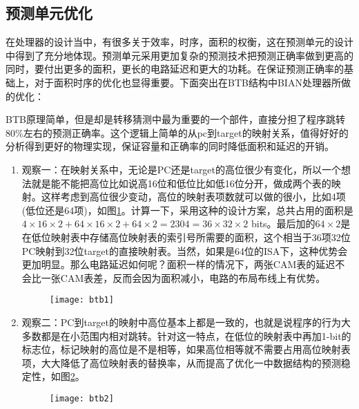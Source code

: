 \subsection{预测单元优化}
在处理器的设计当中，有很多关于效率，时序，面积的权衡，这在预测单元的设计中得到了充分地体现。预测单元采用更加复杂的预测技术把预测正确率做到更高的同时，要付出更多的面积，更长的电路延迟和更大的功耗。在保证预测正确率的基础上，对于面积时序的优化也显得重要。下面突出在BTB结构中BIAN处理器所做的优化：

BTB原理简单，但是却是转移猜测中最为重要的一个部件，直接分担了程序跳转80\%左右的预测正确率。这个逻辑上简单的从pc到target的映射关系，值得好好的分析得到更好的物理实现，保证容量和正确率的同时降低面积和延迟的开销。
\begin{enumerate}[label=(\arabic*)]
	\item 观察一：在映射关系中，无论是PC还是target的高位很少有变化，所以一个想法就是能不能把高位比如说高16位和低位比如低16位分开，做成两个表的映射。这样考虑到高位很少变动，高位的映射表项数就可以做的很小，比如4项(低位还是64项)，如图\ref{fig:btb_opt1}。计算一下，采用这种的设计方案，总共占用的面积是$ 4\times16\times2 + 64\times16\times2 + 64\times2 = 2304 = 36\times 32\times 2 $ bits。最后加的$ 64\times2 $是在低位映射表中存储高位映射表的索引号所需要的面积，这个相当于36项32位PC映射到32位target的直接映射表。当然，如果是64位的ISA下，这种优势会更加明显。那么电路延迟如何呢？面积一样的情况下，两张CAM表的延迟不会比一张CAM表差，反而会因为面积减小，电路的布局布线上有优势。
	\begin{figure}[!htbp]
		\centering
		\texttt{[image: btb1]}
		\label{fig:btb_opt1}
	\end{figure}	
	\item 观察二：PC到target的映射中高位基本上都是一致的，也就是说程序的行为大多数都是在小范围内相对跳转。针对这一特点，在低位的映射表中再加1-bit的标志位，标记映射的高位是不是相等，如果高位相等就不需要占用高位映射表项，大大降低了高位映射表的替换率，从而提高了优化一中数据结构的预测稳定性，如图\ref{fig:btb_opt2}。
	\begin{figure}[!htbp]
		\centering
		\texttt{[image: btb2]}
		\label{fig:btb_opt2}
	\end{figure}
\end{enumerate}

